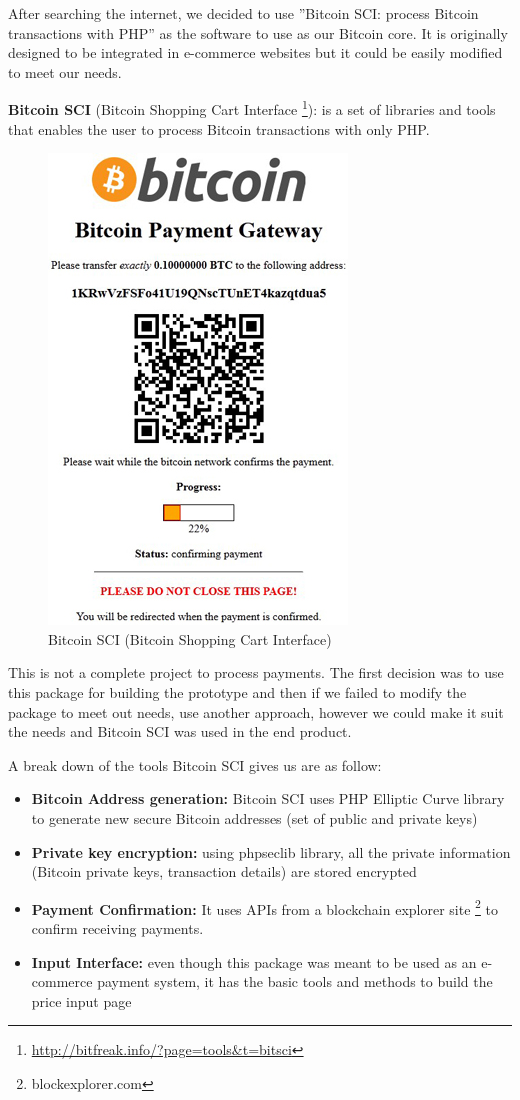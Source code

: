 After searching the internet, we decided to use ''Bitcoin SCI: process Bitcoin transactions with PHP'' as the software to use as our Bitcoin core. It is originally designed to be integrated in e-commerce websites but it could be easily modified to meet our needs. 


\textbf{Bitcoin SCI } (Bitcoin Shopping Cart Interface \footnote{\url{http://bitfreak.info/?page=tools&t=bitsci}}): is a set of libraries and tools that enables the user to process Bitcoin transactions with only PHP. 

\begin{figure}[htb!p]
\centering
\includegraphics[scale=0.5]{fig/bitsci_screen.jpg}
  \caption{Bitcoin SCI (Bitcoin Shopping Cart Interface)}
\label{fig:bitcoin-sci}
\end{figure}


This is not a complete project to process payments. The first decision was to use this package for building the prototype and then if we failed to modify the package to meet out needs, use another approach, however we could make it suit the needs and Bitcoin SCI was used in the end product. 

A break down of the tools Bitcoin SCI gives us are as follow:
\begin{itemize}
\item \textbf{Bitcoin Address generation: } Bitcoin SCI uses PHP Elliptic Curve library to generate new secure Bitcoin addresses (set of public and private keys)
\item \textbf{Private key encryption: } using phpseclib library, all the private information (Bitcoin private keys, transaction details) are stored encrypted
\item \textbf{Payment Confirmation: } It uses APIs from a blockchain explorer site \footnote{blockexplorer.com} to confirm receiving payments.
\item \textbf{Input Interface: } even though this package was meant to be used as an e-commerce payment system, it has the basic tools and methods to build the price input page
\end{itemize}

